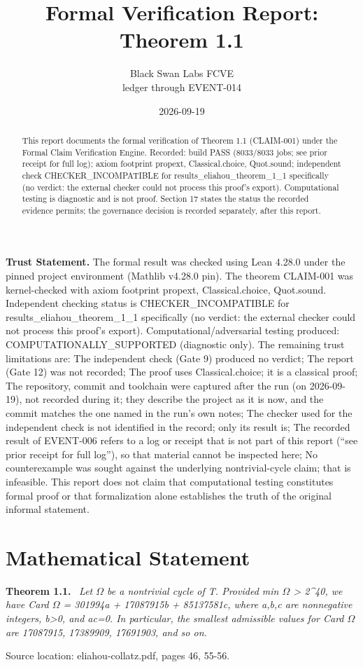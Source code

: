 \documentclass[11pt]{article}
\title{Formal Verification Report: Theorem 1.1}
\author{Black Swan Labs FCVE \\ ledger through EVENT-014}
\date{2026-09-19}
\newenvironment{sourceresult}[1]{\par\medskip\noindent\textbf{#1.}\ \itshape}{\par\medskip}
\begin{document}
\maketitle

\noindent\textbf{Trust Statement.} The formal result was checked using Lean 4.28.0 under the pinned project environment (Mathlib v4.28.0 pin). The theorem CLAIM-001 was kernel-checked with axiom footprint propext, Classical.choice, Quot.sound. Independent checking status is CHECKER\_INCOMPATIBLE for results\_eliahou\_theorem\_1\_1 specifically (no verdict: the external checker could not process this proof's export). Computational/adversarial testing produced: COMPUTATIONALLY\_SUPPORTED (diagnostic only). The remaining trust limitations are: The independent check (Gate 9) produced no verdict; The report (Gate 12) was not recorded; The proof uses Classical.choice; it is a classical proof; The repository, commit and toolchain were captured after the run (on 2026-09-19), not recorded during it; they describe the project as it is now, and the commit matches the one named in the run's own notes; The checker used for the independent check is not identified in the record; only its result is; The recorded result of EVENT-006 refers to a log or receipt that is not part of this report (``see prior receipt for full log''), so that material cannot be inspected here; No counterexample was sought against the underlying nontrivial-cycle claim; that is infeasible. This report does not claim that computational testing constitutes formal proof or that formalization alone establishes the truth of the original informal statement.

\begin{abstract}
This report documents the formal verification of Theorem 1.1 (CLAIM-001) under the Formal Claim Verification Engine. Recorded: build PASS (8033/8033 jobs; see prior receipt for full log); axiom footprint propext, Classical.choice, Quot.sound; independent check CHECKER\_INCOMPATIBLE for results\_eliahou\_theorem\_1\_1 specifically (no verdict: the external checker could not process this proof's export). Computational testing is diagnostic and is not proof. Section 17 states the status the recorded evidence permits; the governance decision is recorded separately, after this report.
\end{abstract}

\section{Mathematical Statement}
\begin{sourceresult}{Theorem 1.1}
Let \ensuremath{\Omega} be a nontrivial cycle of T. Provided min \ensuremath{\Omega} > 2\textasciicircum{}40, we have Card \ensuremath{\Omega} = 301994a + 17087915b + 85137581c, where a,b,c are nonnegative integers, b>0, and ac=0. In particular, the smallest admissible values for Card \ensuremath{\Omega} are 17087915, 17389909, 17691903, and so on.
\end{sourceresult}
Source location: eliahou-collatz.pdf, pages 46, 55-56.
\end{document}
